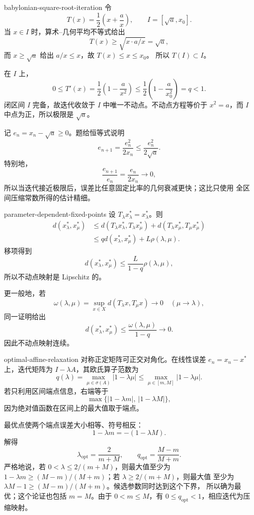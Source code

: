 \begin{solution}{babylonian-square-root-iteration}
令
\[
 T(x)=\frac12\left(x+\frac ax\right),\qquad
 I=[\sqrt a,x_0].
\]
当 \(x\in I\) 时，算术--几何平均不等式给出
\[
 T(x)\ge\sqrt{x\cdot a/x}=\sqrt a,
\]
而 \(x\ge\sqrt a\) 给出 \(a/x\le x\)，故 \(T(x)\le x\le x_0\)。
所以 \(T(I)\subset I\)。

在 \(I\) 上，
\[
 0\le T'(x)=\frac12\left(1-\frac a{x^2}\right)
 \le\frac12\left(1-\frac a{x_0^2}\right)=q<1.
\]
闭区间 \(I\) 完备，故迭代收敛于 \(I\) 中唯一不动点。不动点方程等价于
\(x^2=a\)，而 \(I\) 中点为正，所以极限是 \(\sqrt a\)。

记 \(e_n=x_n-\sqrt a\ge0\)。题给恒等式说明
\[
 e_{n+1}=\frac{e_n^2}{2x_n}
 \le\frac{e_n^2}{2\sqrt a}.
\]
特别地，
\[
 \frac{e_{n+1}}{e_n}=\frac{e_n}{2x_n}\longrightarrow0,
\]
所以当迭代接近极限后，误差比任意固定比率的几何衰减更快；这比只使用
全区间压缩常数所得的估计精细。
\end{solution}

\begin{solution}{parameter-dependent-fixed-points}
设 \(T_\lambda x_\lambda^\ast=x_\lambda^\ast\)。则
\[
\begin{aligned}
 d(x_\lambda^\ast,x_\mu^\ast)
 &\le d(T_\lambda x_\lambda^\ast,T_\lambda x_\mu^\ast)
   +d(T_\lambda x_\mu^\ast,T_\mu x_\mu^\ast)\\
 &\le qd(x_\lambda^\ast,x_\mu^\ast)
   +L\rho(\lambda,\mu).
\end{aligned}
\]
移项得到
\[
 d(x_\lambda^\ast,x_\mu^\ast)
 \le\frac{L}{1-q}\rho(\lambda,\mu),
\]
所以不动点映射是 Lipschitz 的。

更一般地，若
\[
 \omega(\lambda,\mu)
 =\sup_{x\in X}d(T_\lambda x,T_\mu x)\longrightarrow0
 \quad(\mu\to\lambda),
\]
同一证明给出
\[
 d(x_\lambda^\ast,x_\mu^\ast)
 \le\frac{\omega(\lambda,\mu)}{1-q}\longrightarrow0.
\]
因此不动点映射连续。
\end{solution}

\begin{solution}{optimal-affine-relaxation}
对称正定矩阵可正交对角化。在线性误差
\(e_n=x_n-x^\ast\) 上，迭代矩阵为 \(I-\lambda A\)，其欧氏算子范数为
\[
 q(\lambda)=\max_{\mu\in\sigma(A)}|1-\lambda\mu|
 \le\max_{\mu\in[m,M]}|1-\lambda\mu|.
\]
若只利用区间端点信息，右端等于
\[
 \max\{|1-\lambda m|,\ |1-\lambda M|\},
\]
因为绝对值函数在区间上的最大值取于端点。

最优点使两个端点误差大小相等、符号相反：
\[
 1-\lambda m=-(1-\lambda M).
\]
解得
\[
 \lambda_{\mathrm{opt}}=\frac{2}{m+M},\qquad
 q_{\mathrm{opt}}=\frac{M-m}{M+m}.
\]
严格地说，若 \(0<\lambda\le2/(m+M)\)，则最大值至少为
\(1-\lambda m\ge(M-m)/(M+m)\)；若 \(\lambda\ge2/(m+M)\)，则最大值
至少为 \(\lambda M-1\ge(M-m)/(M+m)\)。候选参数同时达到这个下界，
所以确为最优；这个论证也包括 \(m=M\)。由于 \(0<m\le M\)，有
\(0\le q_{\mathrm{opt}}<1\)，相应迭代为压缩映射。
\end{solution}

